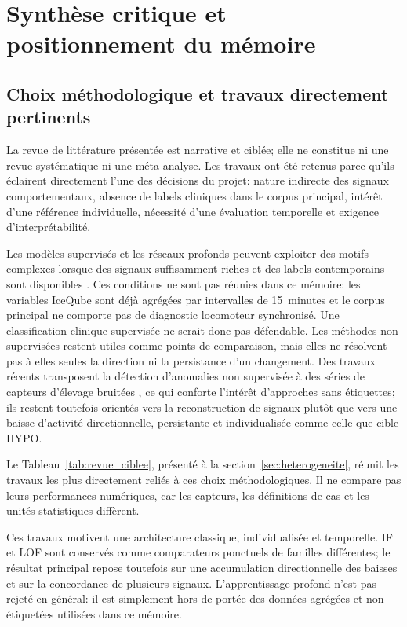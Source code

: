 \FloatBarrier

\section{Synthèse critique et positionnement du mémoire}

\subsection{Choix méthodologique et travaux directement pertinents}
\label{sec:choix_methodo}
La revue de littérature présentée est narrative et ciblée; elle ne constitue ni une revue systématique
ni une méta-analyse. Les travaux ont été retenus parce qu'ils éclairent directement l'une
des décisions du projet: nature indirecte des signaux comportementaux, absence de labels
cliniques dans le corpus principal, intérêt d'une référence individuelle, nécessité d'une
évaluation temporelle et exigence d'interprétabilité.

Les modèles supervisés et les réseaux profonds peuvent exploiter des motifs complexes lorsque
des signaux suffisamment riches et des labels contemporains sont disponibles
\citep{vanhertem2014evaluation,balasso2023behaviour}. Ces conditions ne sont pas réunies dans ce mémoire: les variables IceQube sont déjà agrégées par intervalles de 15~minutes et le corpus
principal ne comporte pas de diagnostic locomoteur synchronisé. Une classification clinique
supervisée ne serait donc pas défendable. Les méthodes non supervisées restent utiles comme
points de comparaison, mais elles ne résolvent pas à elles seules la direction ni la
persistance d'un changement. Des travaux récents transposent la détection d'anomalies non
supervisée à des séries de capteurs d'élevage bruitées \citep{kakar2024timetector}, ce qui
conforte l'intérêt d'approches sans étiquettes; ils restent toutefois orientés vers la
reconstruction de signaux plutôt que vers une baisse d'activité directionnelle,
persistante et individualisée comme celle que cible HYPO.

Le Tableau~\ref{tab:revue_ciblee}, présenté à la section~\ref{sec:heterogeneite}, réunit
les travaux les plus directement reliés à ces choix méthodologiques. Il ne compare pas leurs
performances numériques, car les capteurs, les définitions de cas et les unités statistiques
diffèrent.

Ces travaux motivent une architecture classique, individualisée et temporelle. IF et LOF
sont conservés comme comparateurs ponctuels de familles différentes; le résultat principal
repose toutefois sur une accumulation directionnelle des baisses et sur la concordance de
plusieurs signaux. L'apprentissage profond n'est pas rejeté en général: il est simplement
hors de portée des données agrégées et non étiquetées utilisées dans ce mémoire.

